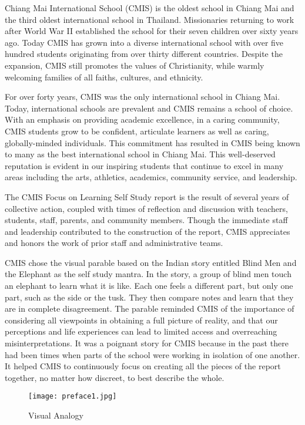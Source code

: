 Chiang Mai International School (CMIS) is the oldest school in Chiang Mai and the third oldest international school in Thailand. Missionaries returning to work after World War II established the school for their seven children over sixty years ago. Today CMIS has grown into a diverse international school with over five hundred students originating from over thirty different countries. Despite the expansion, CMIS still promotes the values of Christianity, while warmly welcoming families of all faiths, cultures, and ethnicity. 

For over forty years, CMIS was the only international school in Chiang Mai. Today, international schools are prevalent and CMIS remains a school of choice. With an emphasis on providing academic excellence, in a caring community, CMIS students grow to be confident, articulate learners as well as caring, globally-minded individuals. This commitment has resulted in CMIS being known to many as the best international school in Chiang Mai. This well-deserved reputation is evident in our inspiring students that continue to excel in many areas including the arts, athletics, academics, community service, and leadership. 

The CMIS Focus on Learning Self Study report is the result of several years of collective action, coupled with times of reflection and discussion with teachers, students, staff, parents, and community members. Though the immediate staff and leadership contributed to the construction of the report, CMIS appreciates and honors the work of prior staff and administrative teams. 

CMIS chose the visual parable based on the Indian story entitled Blind Men and the Elephant as the self study mantra. In the story, a group of blind men touch an elephant to learn what it is like. Each one feels a different part, but only one part, such as the side or the tusk. They then compare notes and learn that they are in complete disagreement. The parable reminded CMIS of the importance of considering all viewpoints in obtaining a full picture of reality, and that our perceptions and life experiences can lead to limited access and overreaching misinterpretations. It was a poignant story for CMIS because in the past there had been times when parts of the school were working in isolation of one another. It helped CMIS to continuously focus on creating all the pieces of the report together, no matter how discreet, to best describe the whole. 


\begin{figure}
\centering
\texttt{[image: preface1.jpg]}
\caption{Visual Analogy}
\end{figure}

